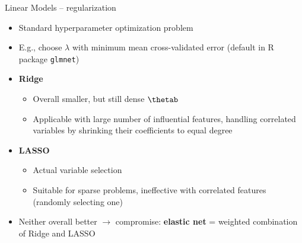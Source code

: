 
\begin{frame}{Linear Models -- regularization}


\begin{itemize}
  \item Standard hyperparameter optimization problem
  \item E.g., choose $\lambda$ with minimum mean cross-validated error 
  (default in R package \texttt{glmnet})
\end{itemize}

\medskip


\begin{itemize}
  \item \textbf{Ridge}
  \begin{itemize} 
    \item Overall smaller, but still dense $\thetab$
    \item Applicable with large number of influential features, handling 
    correlated variables by shrinking their coefficients to equal degree
  \end{itemize}
  \item \textbf{LASSO}
  \begin{itemize} 
    \item Actual variable selection
    \item Suitable for sparse problems, ineffective with correlated 
    features (randomly selecting one)
  \end{itemize}  
  \item Neither overall better $\rightarrow$ compromise: \textbf{elastic net}
  = weighted 
  combination of Ridge and LASSO
\end{itemize}


\end{frame}


